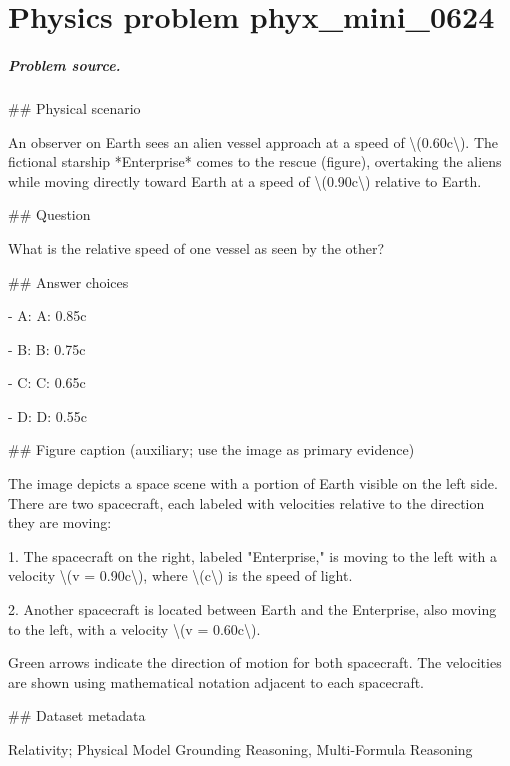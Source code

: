 
\chapter{Physics problem phyx\_mini\_0624}
\label{ch:PhyXMiniProblems_problem_phyx_mini_0624}

\paragraph{Problem source.}
\#\# Physical scenario

An observer on Earth sees an alien vessel approach at a speed of \textbackslash{}(0.60c\textbackslash{}). The fictional starship *Enterprise* comes to the rescue (figure), overtaking the aliens while moving directly toward Earth at a speed of \textbackslash{}(0.90c\textbackslash{}) relative to Earth.

\#\# Question

What is the relative speed of one vessel as seen by the other?

\#\# Answer choices

- A: A: 0.85c

- B: B: 0.75c

- C: C: 0.65c

- D: D: 0.55c

\#\# Figure caption (auxiliary; use the image as primary evidence)

The image depicts a space scene with a portion of Earth visible on the left side. There are two spacecraft, each labeled with velocities relative to the direction they are moving:

1. The spacecraft on the right, labeled "Enterprise," is moving to the left with a velocity \textbackslash{}(v = 0.90c\textbackslash{}), where \textbackslash{}(c\textbackslash{}) is the speed of light. 

2. Another spacecraft is located between Earth and the Enterprise, also moving to the left, with a velocity \textbackslash{}(v = 0.60c\textbackslash{}).

Green arrows indicate the direction of motion for both spacecraft. The velocities are shown using mathematical notation adjacent to each spacecraft.

\#\# Dataset metadata

Relativity; Physical Model Grounding Reasoning, Multi-Formula Reasoning

